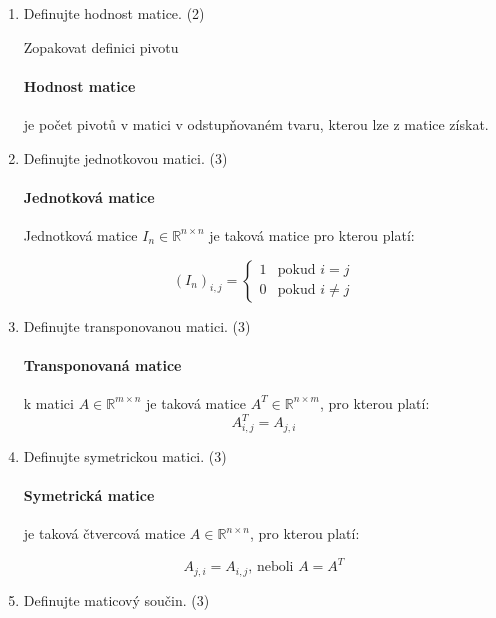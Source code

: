 \documentclass[10pt,a4paper]{article}
\begin{document}
\begin{enumerate}
\item Definujte hodnost matice. (2)

Zopakovat definici pivotu

\paragraph{Hodnost matice} je počet pivotů v matici v odstupňovaném tvaru, kterou lze z matice získat.

\item Definujte jednotkovou matici. (3)

\paragraph{Jednotková matice} Jednotková matice $I_n \in \mathbb{R}^{n \times n}$ je taková matice pro kterou platí:


\begin{equation*}
(I_n)_{i,j} = \begin{cases} 
1 &\text{pokud }  i = j \\
0 &\text{pokud }  i \neq j
\end{cases}
\end{equation*}

\item Definujte transponovanou matici. (3)

\paragraph{Transponovaná matice} k matici $A \in \mathbb{R}^{m \times n}$ je taková matice $A^T \in \mathbb{R}^{n \times m}$, pro kterou platí:
\begin{equation*}
A^T_{i,j} = A_{j,i}
\end{equation*}
 
\item Definujte symetrickou matici. (3)

\paragraph{Symetrická matice} je taková čtvercová matice $A \in \mathbb{R}^{n \times n}$, pro kterou platí:

\begin{equation*}
A_{j,i} = A_{i, j} \text{, neboli } A = A^T
\end{equation*}

\item Definujte maticový součin. (3)


\end{enumerate}
\end{document}
